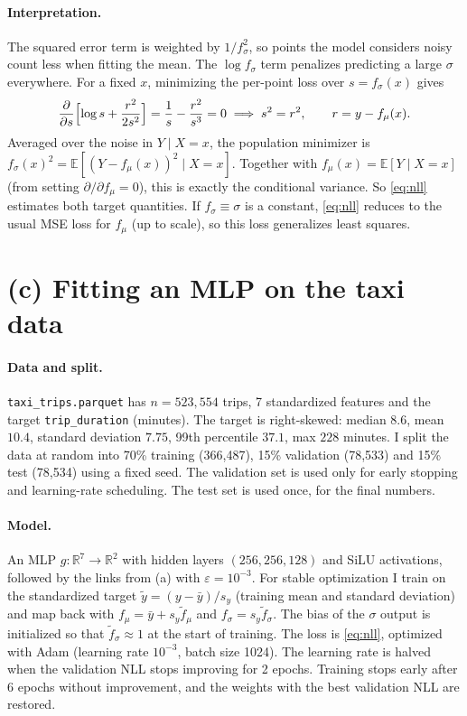 \documentclass[11pt]{article}
\newcommand{\E}{\mathbb{E}}
\newcommand{\R}{\mathbb{R}}
\begin{document}
\paragraph{Interpretation.} The squared error term is weighted by $1/f_\sigma^2$, so points the
model considers noisy count less when fitting the mean. The $\log f_\sigma$ term penalizes
predicting a large $\sigma$ everywhere. For a fixed $x$, minimizing the per-point loss over
$s=f_\sigma(x)$ gives
\[
 \frac{\partial}{\partial s}\Bigl[\log s + \frac{r^2}{2s^2}\Bigr]
   = \frac1s - \frac{r^2}{s^3} = 0 \;\Longrightarrow\; s^2 = r^2,
 \qquad r = y-f_\mu(x).
\]
Averaged over the noise in $Y\mid X=x$, the population minimizer is
$f_\sigma(x)^2 = \E[(Y-f_\mu(x))^2\mid X=x]$. Together with $f_\mu(x)=\E[Y\mid X=x]$ (from setting
$\partial/\partial f_\mu=0$), this is exactly the conditional variance. So \eqref{eq:nll}
estimates both target quantities. If $f_\sigma\equiv\sigma$ is a constant, \eqref{eq:nll} reduces to
the usual MSE loss for $f_\mu$ (up to scale), so this loss generalizes least squares.

\section*{(c) Fitting an MLP on the taxi data}

\paragraph{Data and split.}
\texttt{taxi\_trips.parquet} has $n=523{,}554$ trips, 7 standardized features and the target
\texttt{trip\_duration} (minutes). The target is right-skewed: median $8.6$, mean $10.4$, standard
deviation $7.75$, 99th percentile $37.1$, max $228$ minutes. I split the data at random into
70\% training (366{,}487), 15\% validation (78{,}533) and 15\% test (78{,}534) using a fixed seed. The
validation set is used only for early stopping and learning-rate scheduling. The test set is used
once, for the final numbers.

\paragraph{Model.}
An MLP $g:\R^7\to\R^2$ with hidden layers $(256,256,128)$ and SiLU activations, followed by the links
from (a) with $\varepsilon=10^{-3}$. For stable optimization I train on the standardized target
$\tilde y=(y-\bar y)/s_y$ (training mean and standard deviation) and map back with
$f_\mu = \bar y + s_y\tilde f_\mu$ and $f_\sigma = s_y\tilde f_\sigma$. The bias of the $\sigma$
output is initialized so that $\tilde f_\sigma\approx1$ at the start of training. The loss is
\eqref{eq:nll}, optimized with Adam (learning rate $10^{-3}$, batch size 1024). The learning rate is
halved when the validation NLL stops improving for 2 epochs. Training stops early after 6 epochs
without improvement, and the weights with the best validation NLL are restored.
\end{document}
